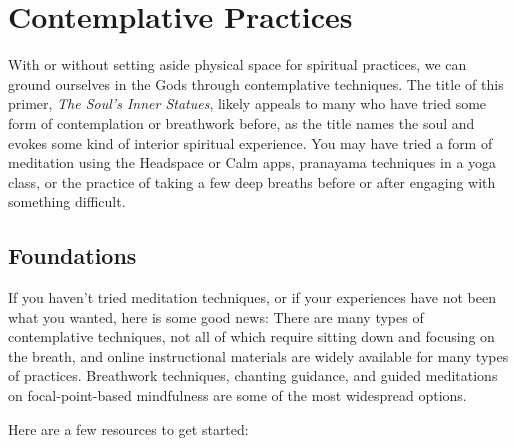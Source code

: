 \documentclass[
]{book}
\begin{document}
\hypertarget{contemplative-practices}{%
\section{Contemplative Practices}\label{contemplative-practices}}

With or without setting aside physical space for spiritual practices, we can ground ourselves in the Gods through contemplative techniques. The title of this primer, \emph{The Soul's Inner Statues}, likely appeals to many who have tried some form of contemplation or breathwork before, as the title names the soul and evokes some kind of interior spiritual experience. You may have tried a form of meditation using the Headspace or Calm apps, pranayama techniques in a yoga class, or the practice of taking a few deep breaths before or after engaging with something difficult.

\hypertarget{foundations-1}{%
\subsection{Foundations}\label{foundations-1}}

If you haven't tried meditation techniques, or if your experiences have not been what you wanted, here is some good news: There are many types of contemplative techniques, not all of which require sitting down and focusing on the breath, and online instructional materials are widely available for many types of practices. Breathwork techniques, chanting guidance, and guided meditations on focal-point-based mindfulness are some of the most widespread options.

Here are a few resources to get started:
\end{document}
